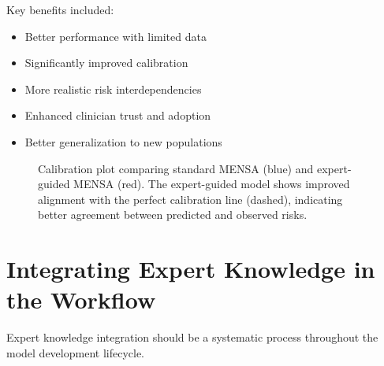 Key benefits included:
\begin{itemize}
    \item Better performance with limited data
    \item Significantly improved calibration
    \item More realistic risk interdependencies
    \item Enhanced clinician trust and adoption
    \item Better generalization to new populations
\end{itemize}

\begin{figure}[htbp]
    \centering
    \caption{Calibration plot comparing standard MENSA (blue) and expert-guided MENSA (red). The expert-guided model shows improved alignment with the perfect calibration line (dashed), indicating better agreement between predicted and observed risks.}
    \label{fig:calibration-comparison}
\end{figure}

\section{Integrating Expert Knowledge in the Workflow}

Expert knowledge integration should be a systematic process throughout the model development lifecycle.

